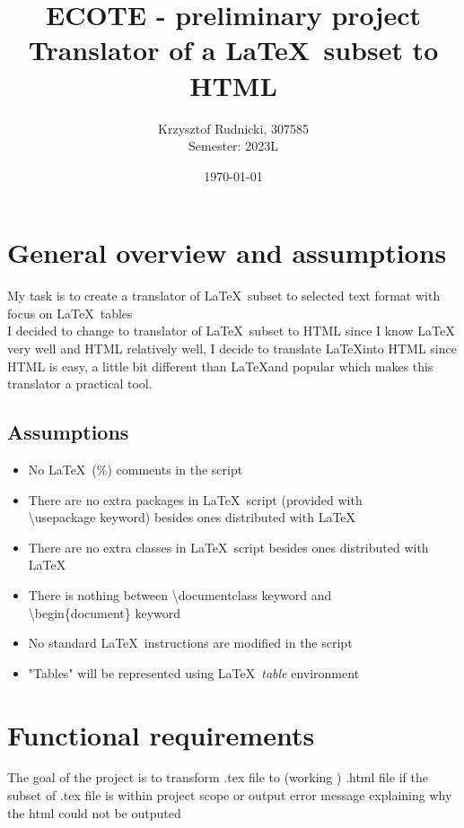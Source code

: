 \documentclass[12pt]{article}
\date{\today}
\title{ECOTE - preliminary project \\ 
Translator of a \LaTeX \, subset to HTML
}
\author{Krzysztof Rudnicki, 307585 \\
Semester: 2023L}
\begin{document}
\maketitle
\section{General overview and assumptions}
My task is to create a translator of \LaTeX \, subset to selected text format with focus on \LaTeX \, tables \\ 
I decided to change to translator of \LaTeX \, subset to HTML since I know \LaTeX \, very well and HTML relatively well, I decide to translate \LaTeX into HTML since HTML is easy, a little bit different than \LaTeX and popular which makes this translator a practical tool.
\subsection{Assumptions}
\begin{itemize}
    \item No \LaTeX \, (\%) comments in the script 
    \item There are no extra packages in \LaTeX \, script (provided with \\ \textbackslash usepackage keyword) besides ones distributed with \LaTeX
    \item There are no extra classes in \LaTeX \, script besides ones distributed with \LaTeX
    \item There is nothing between \textbackslash documentclass keyword and \\ \textbackslash begin\{document\} keyword 
    \item No standard \LaTeX \, instructions are modified in the script
    \item "Tables" will be represented using \LaTeX \, \emph{table} environment 
\end{itemize}
\section{Functional requirements}
The goal of the project is to transform .tex file to (working ) .html file if the subset of .tex file is within project scope or output error message explaining why the html could not be outputed
\end{document}
